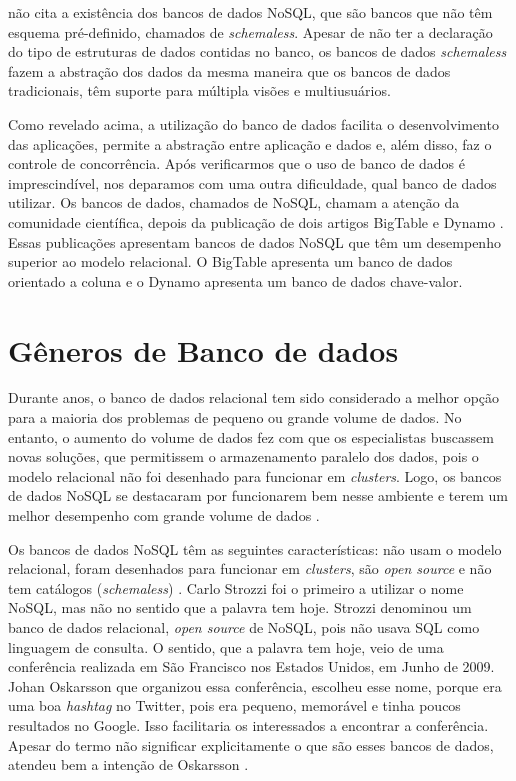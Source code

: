  não cita a existência dos bancos de dados NoSQL, que são bancos que não têm esquema pré-definido, chamados de \textit{schemaless}. Apesar de não ter a declaração do tipo de estruturas de dados contidas no banco, os bancos de dados \textit{schemaless} fazem a abstração dos dados da mesma maneira que os bancos de dados tradicionais, têm suporte para múltipla visões e multiusuários.

Como revelado acima, a utilização do banco de dados facilita o desenvolvimento das aplicações, permite a abstração entre aplicação e dados e, além disso, faz o controle de concorrência. Após verificarmos que o uso de banco de dados é imprescindível, nos deparamos com uma outra dificuldade, qual banco de dados utilizar. Os bancos de dados, chamados de NoSQL, chamam a atenção da comunidade científica, depois da publicação de dois artigos BigTable \cite{bigtable} e Dynamo \cite{dynamo}. Essas publicações apresentam bancos de dados NoSQL que têm um desempenho superior ao modelo relacional. O BigTable apresenta um banco de dados orientado a coluna e o Dynamo apresenta um banco de dados chave-valor.

\section{Gêneros de Banco de dados}
\label{sec:databasetype}
Durante anos, o banco de dados relacional tem sido considerado a melhor opção para a maioria dos problemas de pequeno ou grande volume de dados. No entanto, o aumento do volume de dados fez com que os especialistas buscassem novas soluções, que permitissem o armazenamento paralelo dos dados, pois o modelo relacional não foi desenhado para funcionar em \textit{clusters}. Logo, os bancos de dados NoSQL se destacaram por funcionarem bem nesse ambiente e terem um melhor desempenho com grande volume de dados \cite{NoSQL}.

Os bancos de dados NoSQL têm as seguintes características: não usam o modelo relacional, foram desenhados para funcionar em \textit{clusters}, são \textit{open source} e não tem catálogos (\textit{schemaless}) \cite{NoSQL}. Carlo Strozzi foi o primeiro a utilizar o nome NoSQL, mas não no sentido que a palavra tem hoje. Strozzi denominou um banco de dados relacional, \textit{open source} de NoSQL, pois não usava \ac{SQL} como linguagem de consulta. O sentido, que a palavra tem hoje, veio de uma conferência realizada em São Francisco nos Estados Unidos, em Junho de 2009. Johan Oskarsson que organizou essa conferência, escolheu esse nome, porque era uma boa \textit{hashtag} no Twitter, pois era pequeno, memorável e tinha poucos resultados no Google. Isso facilitaria os interessados a encontrar a conferência. Apesar do termo não significar explicitamente o que são esses bancos de dados, atendeu bem a intenção de Oskarsson \cite{NoSQL}.


